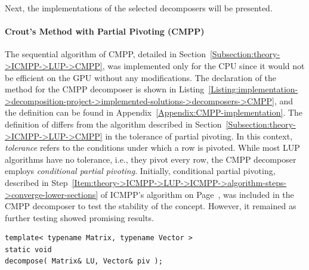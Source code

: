 Next, the implementations of the selected decomposers will be presented.

\paragraph{Crout's Method with Partial Pivoting (CMPP)}\label{Paragraph:implementation->decomposition-project->implemented-solutions->decomposers->CMPP}
The sequential algorithm of CMPP, detailed in Section~\ref{Subsection:theory->ICMPP->LUP->CMPP}, was implemented only for the CPU since it would not be efficient on the GPU without any modifications.
The declaration of the  method for the CMPP decomposer is shown in Listing~\ref{Listing:implementation->decomposition-project->implemented-solutions->decomposers->CMPP}, and the definition can be found in Appendix~\ref{Appendix:CMPP-implementation}.
The definition of  differs from the algorithm described in Section~\ref{Subsection:theory->ICMPP->LUP->CMPP} in the tolerance of partial pivoting.
In this context, \textit{tolerance} refers to the conditions under which a row is pivoted.
While most LUP algorithms have no tolerance, i.e., they pivot every row, the CMPP decomposer employs \textit{conditional partial pivoting}.
Initially, conditional partial pivoting, described in Step~\ref{Item:theory->ICMPP->LUP->ICMPP->algorithm-steps->converge-lower-sections} of ICMPP's algorithm on Page~\pageref{Item:theory->ICMPP->LUP->ICMPP->algorithm-steps->converge-lower-sections}, was included in the CMPP decomposer to test the stability of the concept.
However, it remained as further testing showed promising results.

\begin{lstlisting}[caption={The declaration of the \code{decompose()} method for the CMPP decomposer.
On input, matrix \code{LU} is assumed to contain the values of $\mathbf{A}$, and \code{piv} is expected to be appropriately sized.
On output, matrix \code{LU} contains the values of matrices $\mathbf{L}$ and $\mathbf{U}$ in the format presented in Equation~\ref{Equation:implementation->decomposition-project->implemented-solutions->decomposers->CMPP}, and \code{piv} contains the row permutations in the format set by cuSOLVER and cuBLAS, i.e., row \code{i} was swapped with row \code{piv[ i ]} \cite{5D33zKi5iStCty0r}.
The template parameters, \code{Matrix} and \code{Vector}, are expected to be data structures from TNL that inherit from the \code{TNL::Matrices::DenseMatrix} and \code{TNL::Containers::Vector} types, respectively.},label={Listing:implementation->decomposition-project->implemented-solutions->decomposers->CMPP}]
template< typename Matrix, typename Vector >
static void
decompose( Matrix& LU, Vector& piv );
\end{lstlisting}

